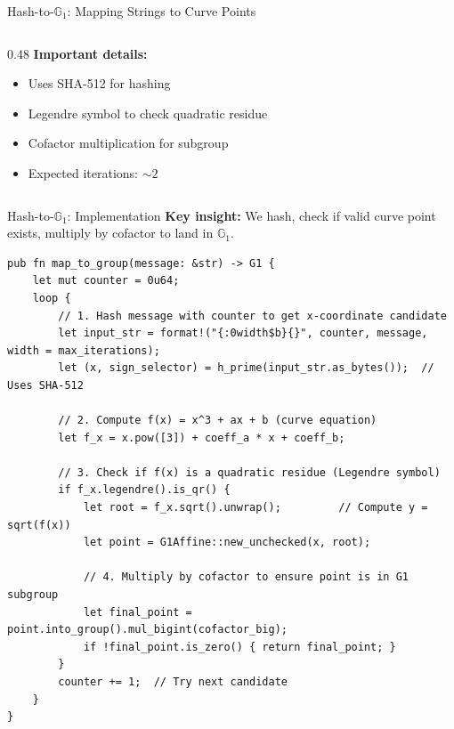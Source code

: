 \documentclass[aspectratio=169,10pt]{beamer}
\newcommand{\G}{\mathbb{G}}
\begin{document}
\begin{frame}{Hash-to-$\G_1$: Mapping Strings to Curve Points}
\begin{columns}[T]
\begin{column}{0.48\textwidth}
            \vspace{0.3em}
            \textbf{Important details:}
            \begin{itemize}
                \item Uses SHA-512 for hashing
                \item Legendre symbol to check quadratic residue
                \item Cofactor multiplication for subgroup
                \item Expected iterations: $\sim 2$
            \end{itemize}
        \end{column}
    \end{columns}
\end{frame}

\begin{frame}[fragile]{Hash-to-$\G_1$: Implementation}
    \textbf{Key insight:} We hash, check if valid curve point exists, multiply by cofactor to land in $\G_1$.

    \vspace{0.3em}
\begin{lstlisting}[style=rust]
pub fn map_to_group(message: &str) -> G1 {
    let mut counter = 0u64;
    loop {
        // 1. Hash message with counter to get x-coordinate candidate
        let input_str = format!("{:0width$b}{}", counter, message, width = max_iterations);
        let (x, sign_selector) = h_prime(input_str.as_bytes());  // Uses SHA-512

        // 2. Compute f(x) = x^3 + ax + b (curve equation)
        let f_x = x.pow([3]) + coeff_a * x + coeff_b;

        // 3. Check if f(x) is a quadratic residue (Legendre symbol)
        if f_x.legendre().is_qr() {
            let root = f_x.sqrt().unwrap();         // Compute y = sqrt(f(x))
            let point = G1Affine::new_unchecked(x, root);

            // 4. Multiply by cofactor to ensure point is in G1 subgroup
            let final_point = point.into_group().mul_bigint(cofactor_big);
            if !final_point.is_zero() { return final_point; }
        }
        counter += 1;  // Try next candidate
    }
}
\end{lstlisting}
\end{frame}
\end{document}
